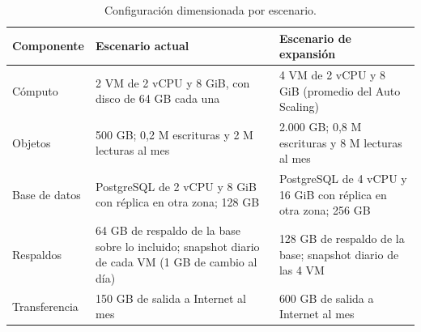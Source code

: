 \documentclass[11pt,letterpaper]{article}
\begin{document}
\begin{table}[H]
\centering\footnotesize
\caption{Configuración dimensionada por escenario.}\label{tab:config}
\begin{tabularx}{\linewidth}{L{2.6cm}YY}
\toprule
\textbf{Componente} & \textbf{Escenario actual} & \textbf{Escenario de expansión}\\
\midrule
Cómputo & 2 VM de 2 vCPU y 8 GiB, con disco de 64 GB cada una & 4 VM de 2 vCPU y 8 GiB (promedio del Auto Scaling)\\
 Objetos & 500 GB; 0,2 M escrituras y 2 M lecturas al mes & 2.000 GB; 0,8 M escrituras y 8 M lecturas al mes\\
Base de datos & PostgreSQL de 2 vCPU y 8 GiB con réplica en otra zona; 128 GB & PostgreSQL de 4 vCPU y 16 GiB con réplica en otra zona; 256 GB\\
 Respaldos & 64 GB de respaldo de la base sobre lo incluido; snapshot diario de cada VM (1 GB de cambio al día) & 128 GB de respaldo de la base; snapshot diario de las 4 VM\\
Transferencia & 150 GB de salida a Internet al mes & 600 GB de salida a Internet al mes\\
\bottomrule
\end{tabularx}
\end{table}
\end{document}
